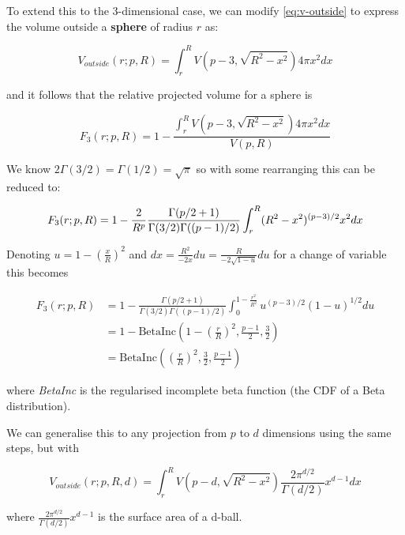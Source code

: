 To extend this to the 3-dimensional case, we can modify \eqref{eq:v-outside} to express the volume outside a \textbf{sphere} of radius \(r\) as:

\begin{equation}
  V_{outside}(r; p, R) = \int_r^R V(p-3, \sqrt{R^2 - x^2})4\pi x^2 dx
\end{equation}

and it follows that the relative projected volume for a sphere is

\begin{equation}
  F_3(r; p, R) = 1 - 
  \frac{
      \int_r^R V(p-3, \sqrt{R^2 - x^2})4\pi x^2 dx
  }{
      V(p, R)
  } 
\end{equation}

We know \(2\Gamma(3/2) = \Gamma(1/2) = \sqrt{ \pi }\) so with some rearranging this can be reduced to:

\begin{equation}
  F_3(r; p, R) = 1 - \frac{2}{R^p} \frac{\Gamma(p/2+1)}{\Gamma(3/2)\Gamma((p-1)/2)}
  \int_r^R (R^2 - x^2)^{(p-3)/2} x^2 dx \\
\end{equation}

Denoting \(u = 1 - \left(\frac{x}{R}\right)^2\) and \(dx = \frac{R^2}{-2x}du = \frac{R}{-2\sqrt{1-u}}du\) for a change of variable this becomes

\begin{align}
  F_3(r; p, R) &= 1 - \frac{\Gamma(p/2+1)}{\Gamma(3/2)\Gamma((p-1)/2)}
  \int_0^{1-\frac{r^2}{R^2}} u^{(p-3)/2} (1-u)^{1/2} du \\
  &= 1 - \mathrm{BetaInc}\left(1-\left(\frac{r}{R}\right)^2, \frac{p-1}{2}, \frac{3}{2}\right) \\
  &= \mathrm{BetaInc}\left(\left(\frac{r}{R}\right)^2, \frac{3}{2}, \frac{p-1}{2}\right) 
  \label{eq:betainc1}
\end{align}

where \emph{BetaInc} is the regularised incomplete beta function (the CDF of a Beta distribution).

We can generalise this to any projection from \(p\) to \(d\) dimensions using the same steps, but with

\begin{equation}
  V_{outside}(r; p, R, d) = \int_r^R V(p-d, \sqrt{R^2 - x^2}) 
  \frac{2\pi^{d/2}}{\Gamma(d/2)} x^{d-1} dx
\end{equation}

where \(\frac{2\pi^{d/2}}{\Gamma(d/2)} x^{d-1}\) is the surface area of a d-ball.

